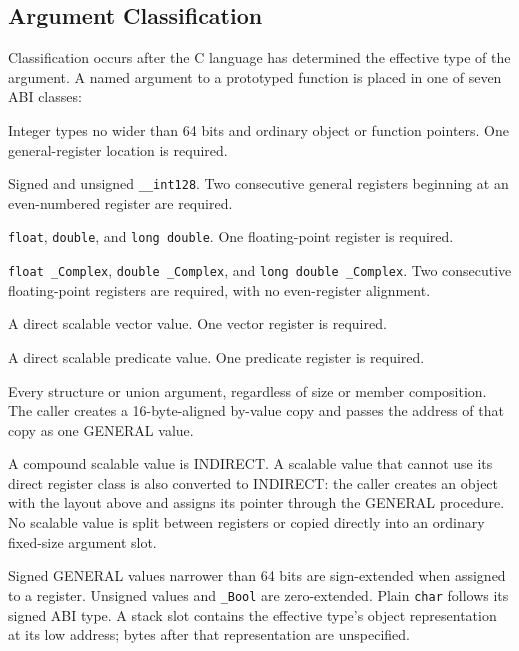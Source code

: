 \documentclass[10pt,twoside]{article}
\begin{document}
\Needspace{2.4in}
\subsection{Argument Classification}
Classification occurs after the C language has determined the effective type
of the argument. A named argument to a prototyped function is placed in one of
seven ABI classes:

\begin{description}[style=nextline,leftmargin=1.35in,labelwidth=1.25in,itemsep=3pt,topsep=3pt]
\item[GENERAL] Integer types no wider than 64 bits and ordinary object or
function pointers. One general-register location is required.
\item[GENERAL-PAIR] Signed and unsigned \texttt{\_\_int128}. Two consecutive
general registers beginning at an even-numbered register are required.
\item[FLOAT] \texttt{float}, \texttt{double}, and \texttt{long double}. One
floating-point register is required.
\item[FLOAT-PAIR] \texttt{float \_Complex}, \texttt{double \_Complex}, and
\texttt{long double \_Complex}. Two consecutive floating-point registers are
required, with no even-register alignment.
\item[VECTOR] A direct scalable vector value. One vector register is required.
\item[PREDICATE] A direct scalable predicate value. One predicate register is
required.
\item[INDIRECT] Every structure or union argument, regardless of size or
member composition. The caller creates a 16-byte-aligned by-value copy and
passes the address of that copy as one GENERAL value.
\end{description}

A compound scalable value is INDIRECT. A scalable value that cannot use its
direct register class is also converted to INDIRECT: the caller creates an
object with the layout above and assigns its pointer through the GENERAL
procedure. No scalable value is split between registers or copied directly
into an ordinary fixed-size argument slot.

Signed GENERAL values narrower than 64 bits are sign-extended when assigned to
a register. Unsigned values and \texttt{\_Bool} are zero-extended. Plain
\texttt{char} follows its signed ABI type. A stack slot contains the effective
type's object representation at its low address; bytes after that
representation are unspecified.
\end{document}
